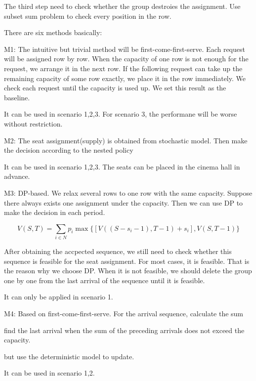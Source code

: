 The third step need to check whether the group destroies the assignment. Use subset sum problem to check every position in the row.

There are six methods basically:

M1:
The intuitive but trivial method will be first-come-first-serve. Each request will be assigned row by row. When the capacity of one row is not enough for the request, we arrange it in the next row. If the following request can take up the remaining capacity of some row exactly, we place it in the row immediately. We check each request until the capacity is used up. We set this result as the baseline.

It can be used in scenario 1,2,3. For scenario 3, the performane will be worse without restriction.


M2: The seat assignment(supply) is obtained from stochastic model. Then make the decision according to the nested policy  

It can be used in scenario 1,2,3. The seats can be placed in the cinema hall in advance.

M3: DP-based. We relax several rows to one row with the same capacity. Suppose there always exists one assignment under the capacity. Then we can use DP to make the decision in each period.

$$V(S,T) = \sum_{i \in N} p_i \max\{ {[V((S-s_i-1),T-1)+ s_i]}, {V(S,T-1)}\}$$

After obtaining the accpected sequence, we still need to check whether this sequence is feasible for the seat assignment. For most cases, it is feasible. That is the reason why we choose DP. When it is not feasible, we should delete the group one by one from the last arrival of the sequence until it is feasible.


It can only be applied in scenario 1.

M4: Based on first-come-first-serve. For the arrival sequence, calculate the sum 

find the last arrival when the sum of the preceding arrivals does not exceed the capacity.

but use the deterministic model to update. 

It can be used in scenario 1,2. 


